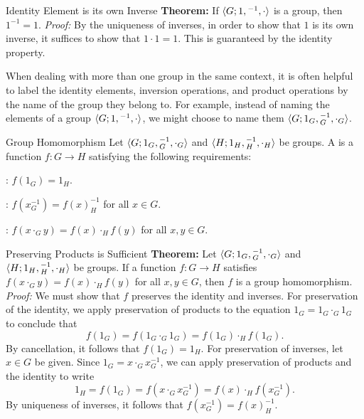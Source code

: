 \documentclass[12pt]{report}
\begin{document}
\begin{thmbox}{Identity Element is its own Inverse}
	\textbf{Theorem:} If ${\langle {G; 1, {}^{-1}, \cdot} \rangle}$ is a group, then $1^{-1} = 1$.
\tcblower
	\textit{Proof:} By the uniqueness of inverses, in order to show that $1$ is its own inverse, it suffices to show that $1 \cdot 1 = 1$. This is guaranteed by the identity property.
\end{thmbox}

When dealing with more than one group in the same context, it is often helpful to label the identity elements, inversion operations, and product operations by the name of the group they belong to. For example, instead of naming the elements of a group ${\langle {G; 1, {}^{-1}, \cdot} \rangle}$, we might choose to name them ${\langle {G; 1_G, {}^{-1}_G, \cdot_G} \rangle}$.

\begin{dfnbox}{Group Homomorphism}
	Let ${\langle {G; 1_G, {}^{-1}_G, \cdot_G} \rangle}$ and ${\langle {H; 1_H, {}^{-1}_H, \cdot_H} \rangle}$ be groups. A  is a function $f: G \to H$ satisfying the following requirements:
	\begin{dfnitems}
		\item {}: $f(1_G) = 1_H$.
		\item {}: $f(x^{-1}_G) = f(x)^{-1}_H$ for all $x \in G$.
		\item {}: $f(x \cdot_G y) = f(x) \cdot_H f(y)$ for all $x, y \in G$.
	\end{dfnitems}
\end{dfnbox}

\begin{thmbox}{Preserving Products is Sufficient}
	\textbf{Theorem:} Let ${\langle {G; 1_G, {}^{-1}_G, \cdot_G} \rangle}$ and ${\langle {H; 1_H, {}^{-1}_H, \cdot_H} \rangle}$ be groups. If a function $f: G \to H$ satisfies $f(x \cdot_G y) = f(x) \cdot_H f(y)$ for all $x, y \in G$, then $f$ is a group homomorphism.
\tcblower
	\textit{Proof:} We must show that $f$ preserves the identity and inverses. For preservation of the identity, we apply preservation of products to the equation $1_G = 1_G \cdot_G 1_G$ to conclude that
	\[ f(1_G) = f(1_G \cdot_G 1_G) = f(1_G) \cdot_H f(1_G). \]
	By cancellation, it follows that $f(1_G) = 1_H$. For preservation of inverses, let $x \in G$ be given. Since $1_G = x \cdot_G x^{-1}_G$, we can apply preservation of products and the identity to write
	\[ 1_H = f(1_G) = f(x \cdot_G x^{-1}_G) = f(x) \cdot_H f(x^{-1}_G). \]
	By uniqueness of inverses, it follows that $f(x^{-1}_G) = f(x)^{-1}_H$.
\end{thmbox}
\end{document}
